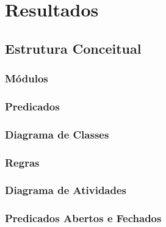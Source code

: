 \documentclass[openright]{normas-utf-tex} %
\begin{document}
		

\chapter{Resultados}
\label{chap:resul}

	
	
	\section{Estrutura Conceitual}

	

		\subsection{Módulos} \label{mods}
			\label{risk}
			
		
		\subsection{Predicados} 
			
		
		\subsection{Diagrama de Classes}
			


		\subsection{Regras}
			\label{regras}
			

		\subsection{Diagrama de Atividades} \label{umldiagram}
		
			

		\subsection{Predicados Abertos e Fechados} \label{cenarios}
		
			
\end{document}
